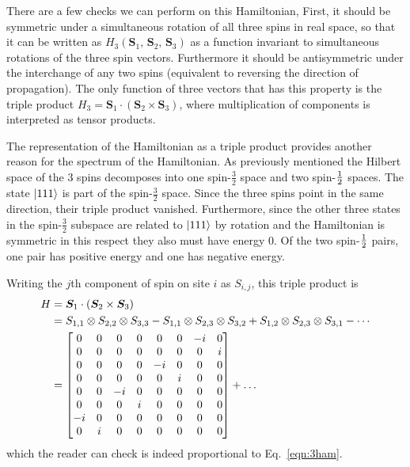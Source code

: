 There are a few checks we can perform on this Hamiltonian, First, it should be symmetric under a simultaneous rotation of all three spins in real space, so that it can be written as $H_3(\bm{S}_1,\,\bm{S}_2 ,\,\bm{S}_3)$ as a function invariant to simultaneous rotations of the three spin vectors. Furthermore it should be antisymmetric under the interchange of any two spins (equivalent to reversing the direction of propagation). The only function of three vectors that has this property is the triple product $H_3= \bm{S}_1\cdot\left(\bm{S}_2 \times\bm{S}_3\right)$, where multiplication of components is interpreted as tensor products.

The representation of the Hamiltonian as a triple product provides another reason for the spectrum of the Hamiltonian. As previously mentioned the Hilbert space of the 3 spins decomposes into one spin-$\frac{3}{2}$ space and two spin-$\frac{1}{2}$ spaces. The state $\left|111\right\rangle$ is part of the spin-$\frac{3}{2}$ space. Since the three spins point in the same direction, their triple product vanished. Furthermore, since the other three states in the spin-$\frac{3}{2}$ subspace are related to $\left|111\right\rangle$ by rotation and the Hamiltonian is symmetric in this respect they also must have energy 0. Of the two spin-$\frac{1}{2}$ pairs, one pair has positive energy and one has negative energy.

Writing the $j$th component of spin on site $i$ as $S_{i,j}$, this triple product is
\begin{align}
H &= \bm{S}_1\cdot\left(\bm{S}_2 \times\bm{S}_3\right) \nonumber\\
&= S_{1,1}\otimes S_{2,2}\otimes{S}_{3,3} - {S}_{1,1}
	\otimes S_{2,3}\otimes S_{3,2} + S_{1,2}\otimes{S}_{2,3} \otimes {S}_{3,1}-\cdots\nonumber\\
&= \begin{bmatrix}
	0 & 0 & 0 & 0 & 0 & 0 &-i & 0 \\
	0 & 0 & 0 & 0 & 0 & 0 & 0 & i \\
	0 & 0 & 0 & 0 &-i & 0 & 0 & 0 \\
	0 & 0 & 0 & 0 & 0 & i & 0 & 0 \\
	0 & 0 &-i & 0 & 0 & 0 & 0 & 0 \\
	0 & 0 & 0 & i & 0 & 0 & 0 & 0 \\
	-i& 0 & 0 & 0 & 0 & 0 & 0 & 0 \\
	0 & i & 0 & 0 & 0 & 0 & 0 & 0
	\end{bmatrix} + \dots
\end{align}
which the reader can check is indeed proportional to Eq.~\ref{eqn:3ham}.

